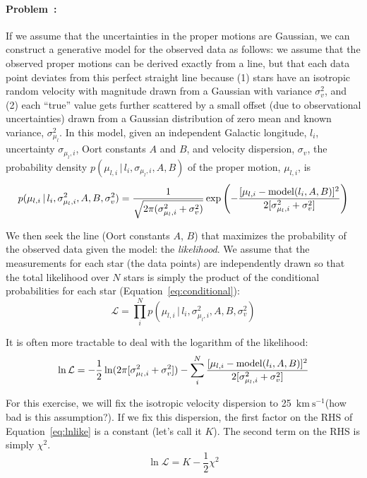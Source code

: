 \documentclass[12pt,twoside]{article}
\newcommand{\given}{\,|\,}
\newcommand{\kms}{$\mathrm{km}~\mathrm{s}^{-1}$}
\newcommand{\problemname}{Problem}
\newcounter{problem}
\newenvironment{problem}{\paragraph{\problemname~\theproblem:}\refstepcounter{problem}}{}
\begin{document}
\begin{problem}
If we assume that the uncertainties in the proper motions are Gaussian, we can construct a generative model for the observed data as follows: we assume that the observed proper motions can be derived exactly from a line, but that each data point deviates from this perfect straight line because (1) stars have an isotropic random velocity with magnitude drawn from a Gaussian with variance $\sigma_v^2$, and (2) each ``true'' value gets further scattered by a small offset (due to observational uncertainties) drawn from a Gaussian distribution of zero mean and known variance, $\sigma^2_{\mu_l}$. In this model, given an independent Galactic longitude, $l_i$, uncertainty $\sigma_{\mu_l, i}$, Oort constants $A$ and $B$, and velocity dispersion, $\sigma_v$, the probability density $p(\mu_{l,i} \given l_i, \sigma_{\mu_l,i}, A, B)$ of the proper motion, $\mu_{l,i}$, is
\begin{equation}
	p(\mu_{l,i} \given l_i, \sigma^2_{\mu_l,i}, A, B, \sigma_v^2) = \frac{1}{\sqrt{2\pi (\sigma_{\mu_l,i}^2 + \sigma_v^2)}}\exp \left( - \frac{[\mu_{l,i} - {\rm model}(l_i,A,B)]^2}{2[\sigma_{\mu_l,i}^2 + \sigma_v^2]}\right)\label{eq:conditional}
\end{equation}

We then seek the line (Oort constants $A$, $B$) that maximizes the probability of the observed data given the model: the \emph{likelihood}. We assume that the measurements for each star (the data points) are independently drawn so that the total likelihood over $N$ stars is simply the product of the conditional probabilities for each star (Equation~\ref{eq:conditional}):
\begin{equation}
	\mathcal{L} = \prod^N_i p(\mu_{l,i} \given l_i, \sigma^2_{\mu_l,i}, A, B, \sigma_v^2)
\end{equation}

It is often more tractable to deal with the logarithm of the likelihood:
\begin{equation}
	\ln \mathcal{L} = -\frac{1}{2}\ln(2\pi[\sigma_{\mu_l,i}^2 + \sigma_v^2]) - \sum^N_i \frac{[\mu_{l,i} - {\rm model}(l_i,A,B)]^2}{2[\sigma_{\mu_l,i}^2 + \sigma_v^2]}\label{eq:lnlike}
\end{equation}

For this exercise, we will fix the isotropic velocity dispersion to 25~\kms (how bad is this assumption?). If we fix this dispersion, the first factor on the RHS of Equation~\ref{eq:lnlike} is a constant (let's call it $K$). The second term on the RHS is simply $\chi^2$.
\begin{equation}
	\ln \mathcal{L} = K - \frac{1}{2}\chi^2
\end{equation}


\end{problem}
\end{document}
